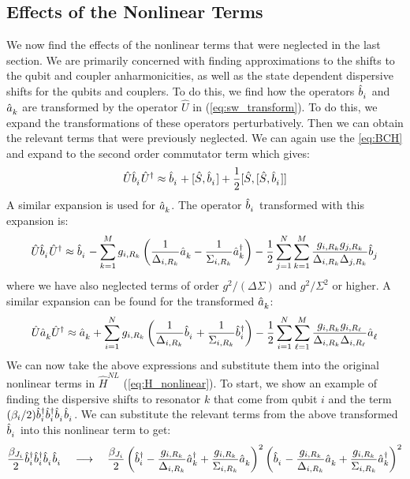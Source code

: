 \subsection{Effects of the Nonlinear Terms}
We now find the effects of the nonlinear terms that were neglected in the last section. We are primarily concerned with finding approximations to the shifts to the qubit and coupler anharmonicities, as well as the state dependent dispersive shifts for the qubits and couplers. To do this, we find how the operators $\opb_i$ and $\opa_k$ are transformed by the operator $\hat{U}$ in (\ref{eq:sw_transform}). To do this, we expand the transformations of these operators perturbatively. Then we can obtain the relevant terms that were previously neglected. We can again use the \ref{eq:BCH} and expand to the second order commutator term which gives:
\begin{equation}
    \hat{U}\opb_i \hat{U}^\dag \approx \opb_i + [\hat{S},\opb_i] + \frac{1}{2}[\hat{S}, [\hat{S},\opb_i]]
\end{equation}
A similar expansion is used for $\opa_k$. The operator $\opb_i$ transformed with this expansion is:
\begin{equation}
    \hat{U}\opb_i \hat{U}^\dag \approx \opb_i - \sum_{k=1}^M g_{i,R_k} \left( \frac{1}{\Delta_{i,R_k}} \opa_k - \frac{1}{\Sigma_{i,R_k}} \opad_k \right) - \frac{1}{2}\sum_{j=1}^N \sum_{k=1}^M \frac{g_{i,R_k}g_{j,R_k}}{\Delta_{i,R_k}\Delta_{j,R_k}} \opb_j
\end{equation}
where we have also neglected terms of order $g^2/(\Delta\Sigma)$ and $g^2/\Sigma^2$ or higher. A similar expansion can be found for the transformed $\opa_k$:
\begin{equation}
    \hat{U}\opa_k \hat{U}^\dag \approx \opa_k + \sum_{i=1}^N g_{i,R_k} \left( \frac{1}{\Delta_{i,R_k}}\opb_i + \frac{1}{\Sigma_{i,R_k}}\opbd_i \right) - \frac{1}{2}\sum_{i=1}^N\sum_{\ell=1}^M \frac{g_{i,R_k}g_{i,R_\ell}}{\Delta_{i,R_k}\Delta_{i,R_\ell}} \opa_{\ell}
\end{equation}
We can now take the above expressions and substitute them into the original nonlinear terms in $\hat{H}^{NL}$ (\ref{eq:H_nonlinear}). To start, we show an example of finding the dispersive shifts to resonator $k$ that come from qubit $i$ and the term $(\beta_i/2)\opbd_i\opbd_i\opb_i\opb_i$. We can substitute the relevant terms from the above transformed $\opb_i$ into this nonlinear term to get:
\begin{equation}
    \frac{\beta_{J_i}}{2}\opbd_i\opbd_i\opb_i\opb_i \quad\longrightarrow\quad \frac{\beta_{J_i}}{2}\left( \opbd_i - \frac{g_{i,R_k}}{\Delta_{i,R_k}}\opad_k + \frac{g_{i,R_k}}{\Sigma_{i,R_k}}\opa_k\right)^2\left(  \opb_i - \frac{g_{i,R_k}}{\Delta_{i,R_k}}\opa_k + \frac{g_{i,R_k}}{\Sigma_{i,R_k}}\opad_k \right)^2
\end{equation} 
